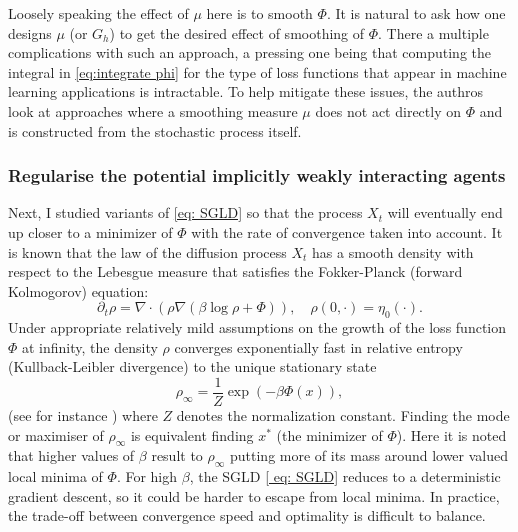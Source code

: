 \documentclass{article}
\begin{document}
Loosely speaking the effect of $\mu$ here is to smooth $\Phi$.
It is natural to ask how one designs $\mu$ (or $G_{h}$)
to get the desired effect of smoothing of $\Phi$. There a multiple complications with such an approach, a pressing one being that computing the integral in \ref{eq:integrate phi}
for the type of loss functions that appear in machine learning applications
is intractable. To help mitigate these issues, the authros look at approaches where a smoothing measure $\mu$ does not act directly on $\Phi$ and is constructed from the stochastic process itself.


\subsubsection{Regularise the potential implicitly weakly interacting agents}\label{sec: weakly interacting agents}

Next, I studied variants of \ref{eq: SGLD} so that the
process $X_{t}$ will eventually end up closer to a minimizer of $\Phi$ with the rate of convergence taken into account. It is known that the law of the diffusion process $X_{t}$
has a smooth density with respect to the Lebesgue measure that satisfies
the Fokker-Planck (forward Kolmogorov) equation: 
\[
\partial_{t}\rho=\nabla\cdot\left(\rho\nabla\left(\beta\log\rho+\Phi\right)\right),\quad\rho(0,\cdot)=\eta_{0}(\cdot).
\]
Under appropriate relatively mild assumptions on the growth of the loss function $\Phi$
at infinity, the density $\rho$ converges exponentially fast in relative
entropy (Kullback-Leibler divergence) to the unique stationary state
\[
\rho_{\infty}=\frac{1}{Z}\exp(-\beta\Phi(x)),
\]
(see for instance \cite[Ch. 4]{pavliotis2014stochastic}) where $Z$ denotes the normalization constant.
Finding the mode or maximiser of $\rho_{\infty}$ is equivalent finding
$x^{*}$ (the minimizer of $ \Phi$). Here it is noted that higher values of $ \beta$
result to $\rho_{\infty}$ putting more of its mass around lower valued
local minima of $\Phi$. For high $\beta$, the SGLD \ref{ eq: SGLD}
reduces to a deterministic gradient descent, so it could be harder
to escape from local minima. In practice, the trade-off between convergence
speed and optimality is difficult to balance.
\end{document}
